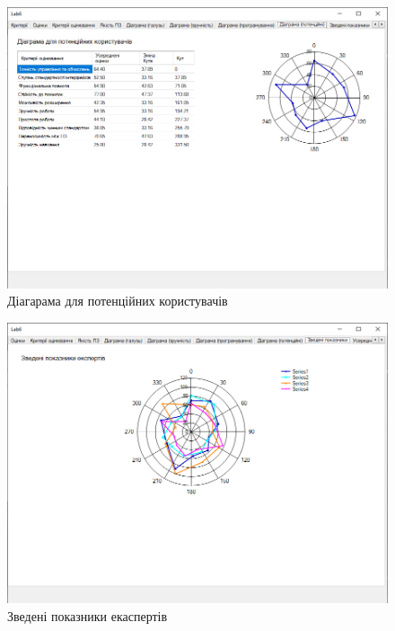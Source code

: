\documentclass[14pt]{extreport}
\begin{document}
\begin{normalsize}
\begin{figure}[H]
	\centering
	\includegraphics[scale=0.55]{8}
	\caption{Діагарама для потенційних користувачів}
\end{figure}

\begin{figure}[H]
	\centering
	\includegraphics[scale=0.55]{9}
	\caption{Зведені показники екаспертів}
\end{figure}


\end{normalsize}
\end{document}
